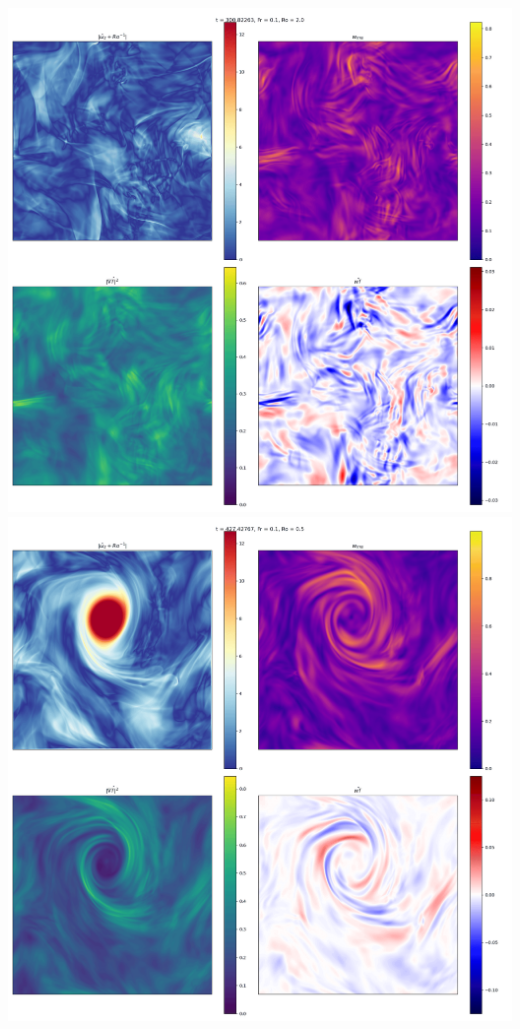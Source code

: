 \documentclass[30pt, blockverticalspace=1cm]{tikzposter}
\begin{document}
\begin{columns}
{    \begin{center}
        \centering
        \includegraphics[width=\linewidth]{images/Om0.5B100Re600Pe60_vert_avg.pdf}
    \emp
        \centering
        \includegraphics[width=\linewidth]{images/Om2B100Re600Pe60_vert_avg.pdf}

\end{center}}
\end{columns}
\end{document}
